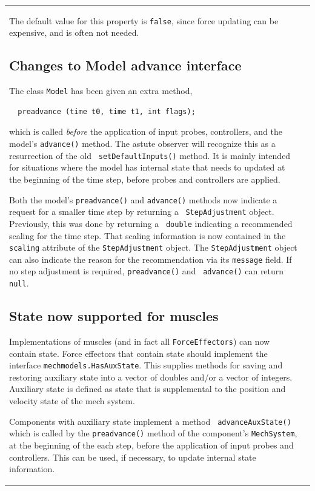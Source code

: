 \documentclass{article}
\begin{document}
\begin{tabular}{ll}
The default value for this property is {\tt false}, since force
updating can be expensive, and is often not needed.

\subsection*{Changes to Model advance interface}

The class {\tt Model} has been given an extra method,

\begin{verbatim}
  preadvance (time t0, time t1, int flags);
\end{verbatim}

which is called {\it before} the application of input probes,
controllers, and the model's {\tt advance()} method. The astute
observer will recognize this as a resurrection of the old {\tt
setDefaultInputs()} method. It is mainly intended for situations where
the model has internal state that needs to updated at the beginning of
the time step, before probes and controllers are applied.

Both the model's {\tt preadvance()} and {\tt advance()} methods now
indicate a request for a smaller time step by returning a {\tt
StepAdjustment} object. Previously, this was done by returning a {\tt
double} indicating a recommended scaling for the time step.  That
scaling information is now contained in the {\tt scaling} attribute of
the {\tt StepAdjustment} object. The {\tt StepAdjustment} object can
also indicate the reason for the recommendation via its {\tt message}
field. If no step adjustment is required, {\tt preadvance()} and {\tt
advance()} can return {\tt null}.

\subsection*{State now supported for muscles}

Implementations of muscles (and in fact all {\tt ForceEffectors}) can
now contain state. Force effectors that contain state should implement
the interface {\tt mechmodels.HasAuxState}. This supplies methods for
saving and restoring auxiliary state into a vector of doubles and/or a
vector of integers. Auxiliary state is defined as state that is
supplemental to the position and velocity state of the mech system.

Components with auxiliary state implement a method {\tt
advanceAuxState()} which is called by the {\tt preadvance()} method of
the component's {\tt MechSystem}, at the beginning of the each step,
before the application of input probes and controllers.  This can
be used, if necessary, to update internal state information.


\end{tabular}
\end{document}
